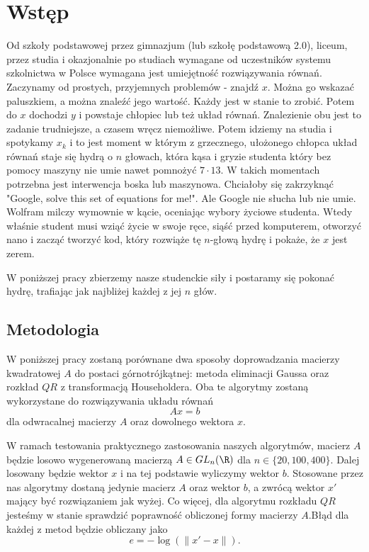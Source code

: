 \section{Wstęp}

Od szkoły podstawowej przez gimnazjum (lub szkołę podstawową 2.0), liceum, przez studia i okazjonalnie po studiach wymagane od uczestników systemu szkolnictwa w Polsce wymagana jest umiejętność rozwiązywania równań. Zaczynamy od prostych, przyjemnych problemów - znajdź $x$. Można go wskazać paluszkiem, a można znaleźć jego wartość. Każdy jest w stanie to zrobić. Potem do $x$ dochodzi $y$ i powstaje chłopiec lub też układ równań. Znalezienie obu jest to zadanie trudniejsze, a czasem wręcz niemożliwe. Potem idziemy na studia i spotykamy $x_k$ i to jest moment w którym z grzecznego, ułożonego chłopca układ równań staje się hydrą o $n$ głowach, która kąsa i gryzie studenta który bez pomocy maszyny nie umie nawet pomnożyć $7\cdot13$. W takich momentach potrzebna jest interwencja boska lub maszynowa. Chciałoby się zakrzyknąć "Google, solve this set of equations for me!". Ale Google nie słucha lub nie umie. Wolfram milczy wymownie w kącie, oceniając wybory życiowe studenta. Wtedy właśnie student musi wziąć życie w swoje ręce, siąść przed komputerem, otworzyć nano i zacząć tworzyć kod, który rozwiąże tę $n$-głową hydrę i pokaże, że $x$ jest zerem.

W poniższej pracy zbierzemy nasze studenckie siły i postaramy się pokonać hydrę, trafiając jak najbliżej każdej z jej $n$ głów.

\subsection{Metodologia}

W poniższej pracy zostaną porównane dwa sposoby doprowadzania macierzy kwadratowej $A$ do postaci górnotrójkątnej: metoda eliminacji Gaussa oraz rozkład $QR$ z transformacją Householdera. Oba te algorytmy zostaną wykorzystane do rozwiązywania układu równań 
$$Ax=b$$
dla odwracalnej macierzy $A$ oraz dowolnego wektora $x$.

W ramach testowania praktycznego zastosowania naszych algorytmów, macierz $A$ będzie losowo wygenerowaną macierzą $A\in GL_n(\R)$ dla $n\in\{20,100,400\}$. Dalej losowany będzie wektor $x$ i na tej podstawie wyliczymy wektor $b$. Stosowane przez nas algorytmy dostaną jedynie macierz $A$ oraz wektor $b$, a zwrócą wektor $x'$ mający być rozwiązaniem jak wyżej. Co więcej, dla algorytmu rozkładu $QR$ jesteśmy w stanie sprawdzić poprawność obliczonej formy macierzy $A$.Błąd dla każdej z metod będzie obliczany jako
$$e=-\log(\|x'-x\|).$$

